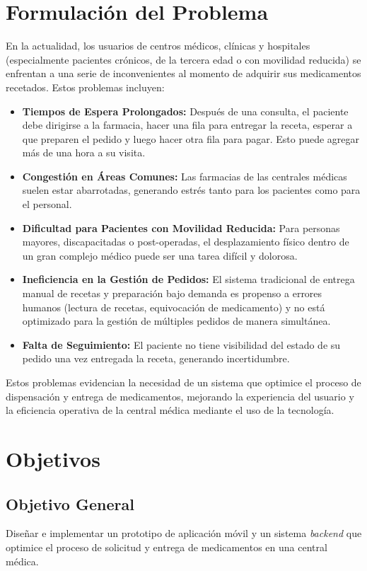 \section{Formulación del Problema}

En la actualidad, los usuarios de centros médicos, clínicas y hospitales (especialmente pacientes crónicos, de la tercera edad o con movilidad reducida) se enfrentan a una serie de inconvenientes al momento de adquirir sus medicamentos recetados. Estos problemas incluyen:

\begin{itemize}
    \item \textbf{Tiempos de Espera Prolongados:} Después de una consulta, el paciente debe dirigirse a la farmacia, hacer una fila para entregar la receta, esperar a que preparen el pedido y luego hacer otra fila para pagar. Esto puede agregar más de una hora a su visita.
    \item \textbf{Congestión en Áreas Comunes:} Las farmacias de las centrales médicas suelen estar abarrotadas, generando estrés tanto para los pacientes como para el personal.
    \item \textbf{Dificultad para Pacientes con Movilidad Reducida:} Para personas mayores, discapacitadas o post-operadas, el desplazamiento físico dentro de un gran complejo médico puede ser una tarea difícil y dolorosa.
    \item \textbf{Ineficiencia en la Gestión de Pedidos:} El sistema tradicional de entrega manual de recetas y preparación bajo demanda es propenso a errores humanos (lectura de recetas, equivocación de medicamento) y no está optimizado para la gestión de múltiples pedidos de manera simultánea.
    \item \textbf{Falta de Seguimiento:} El paciente no tiene visibilidad del estado de su pedido una vez entregada la receta, generando incertidumbre.
\end{itemize}

Estos problemas evidencian la necesidad de un sistema que optimice el proceso de dispensación y entrega de medicamentos, mejorando la experiencia del usuario y la eficiencia operativa de la central médica mediante el uso de la tecnología.

\section{Objetivos}
\label{sec:objetivos}

\subsection{Objetivo General}
Diseñar e implementar un prototipo de aplicación móvil y un sistema \textit{backend} que optimice el proceso de solicitud y entrega de medicamentos en una central médica.

